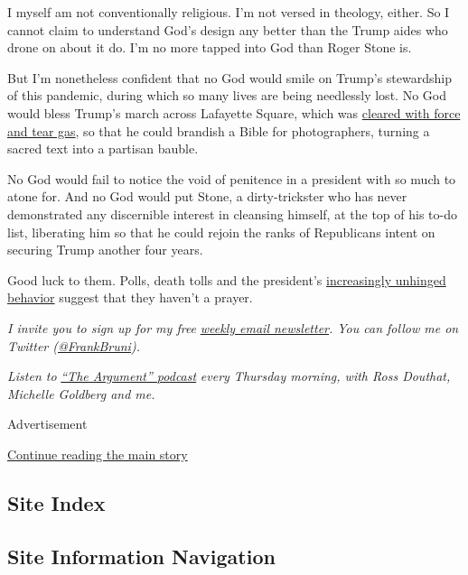 I myself am not conventionally religious. I'm not versed in theology,
either. So I cannot claim to understand God's design any better than the
Trump aides who drone on about it do. I'm no more tapped into God than
Roger Stone is.

But I'm nonetheless confident that no God would smile on Trump's
stewardship of this pandemic, during which so many lives are being
needlessly lost. No God would bless Trump's march across Lafayette
Square, which was
\href{https://www.nytimes.com/2020/06/01/us/politics/trump-st-johns-church-bible.html}{cleared
with force and tear gas}, so that he could brandish a Bible for
photographers, turning a sacred text into a partisan bauble.

No God would fail to notice the void of penitence in a president with so
much to atone for. And no God would put Stone, a dirty-trickster who has
never demonstrated any discernible interest in cleansing himself, at the
top of his to-do list, liberating him so that he could rejoin the ranks
of Republicans intent on securing Trump another four years.

Good luck to them. Polls, death tolls and the president's
\href{https://www.nytimes.com/2020/07/14/us/politics/trump-news-conference.html}{increasingly
unhinged behavior} suggest that they haven't a prayer.

\emph{I invite you to sign up for my free}
\href{https://www.nytimes.com/newsletters/frank-bruni}{\emph{weekly
email newsletter}}\emph{. You can follow me on Twitter
(}\href{https://twitter.com/FrankBruni}{\emph{@FrankBruni}}\emph{).}

\emph{Listen to}
\href{https://www.nytimes.com/column/the-argument}{\emph{``The
Argument'' podcast}} \emph{every Thursday morning, with Ross Douthat,
Michelle Goldberg and me.}

Advertisement

\protect\hyperlink{after-bottom}{Continue reading the main story}

\hypertarget{site-index}{%
\subsection{Site Index}\label{site-index}}

\hypertarget{site-information-navigation}{%
\subsection{Site Information
Navigation}\label{site-information-navigation}}

